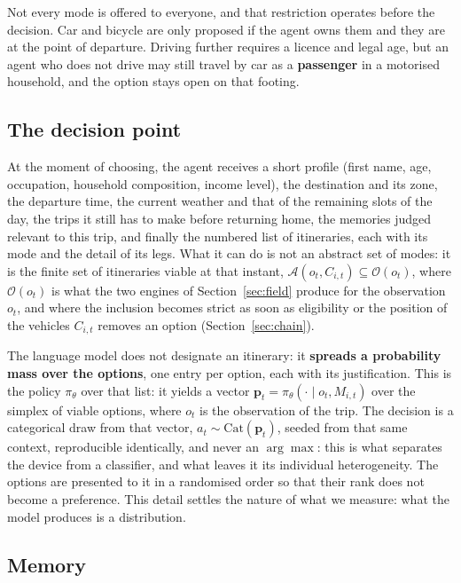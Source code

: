 Not every mode is offered to everyone, and that restriction operates before the decision. Car and bicycle are only proposed if the agent owns them and they are at the point of departure. Driving further requires a licence and legal age, but an agent who does not drive may still travel by car as a \textbf{passenger} in a motorised household, and the option stays open on that footing.

\subsection{The decision point}
\label{sec:decision}

At the moment of choosing, the agent receives a short profile (first name, age, occupation, household composition, income level), the destination and its zone, the departure time, the current weather and that of the remaining slots of the day, the trips it still has to make before returning home, the memories judged relevant to this trip, and finally the numbered list of itineraries, each with its mode and the detail of its legs. What it can do is not an abstract set of modes: it is the finite set of itineraries viable at that instant, $\mathcal{A}(o_t, C_{i,t}) \subseteq \mathcal{O}(o_t)$, where $\mathcal{O}(o_t)$ is what the two engines of Section~\ref{sec:field} produce for the observation $o_t$, and where the inclusion becomes strict as soon as eligibility or the position of the vehicles $C_{i,t}$ removes an option (Section~\ref{sec:chain}).

The language model does not designate an itinerary: it \textbf{spreads a probability mass over the options}, one entry per option, each with its justification. This is the policy $\pi_\theta$ over that list: it yields a vector $\mathbf{p}_t = \pi_\theta(\cdot \mid o_t, M_{i,t})$ over the simplex of viable options, where $o_t$ is the observation of the trip. The decision is a categorical draw from that vector, $a_t \sim \mathrm{Cat}(\mathbf{p}_t)$, seeded from that same context, reproducible identically, and never an $\arg\max$: this is what separates the device from a classifier, and what leaves it its individual heterogeneity. The options are presented to it in a randomised order so that their rank does not become a preference. This detail settles the nature of what we measure: what the model produces is a distribution.

\subsection{Memory}
\label{sec:memory}

